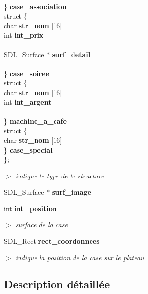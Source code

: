 \begin{CompactItemize}
\begin{tabbing}
\>\>\>\>\\\>\} {\bf case\_association}\\
\>struct \{\\
\>\>char {\bf str\_nom} [16]\\
\>\>int {\bf int\_prix}\\
\>\>\>\>\>\>\\\>\>SDL\_Surface $\ast$ {\bf surf\_detail}\\
\>\>\\\>\} {\bf case\_soiree}\\
\>struct \{\\
\>\>char {\bf str\_nom} [16]\\
\>\>int {\bf int\_argent}\\
\>\>\>\>\>\>\\\>\} {\bf machine\_a\_cafe}\\
\>struct \{\\
\>\>char {\bf str\_nom} [16]\\
\>\} {\bf case\_special}\\
\}; \\

\end{tabbing}\begin{CompactList}\small\item\em $>$ indique le type de la structure \item\end{CompactList}\item 
SDL\_\-Surface $\ast$ {\bf surf\_\-image}
\item 
int {\bf int\_\-position}
\begin{CompactList}\small\item\em $>$ surface de la case \item\end{CompactList}\item 
SDL\_\-Rect {\bf rect\_\-coordonnees}
\begin{CompactList}\small\item\em $>$ indique la position de la case sur le plateau \item\end{CompactList}\end{CompactItemize}


\subsection{Description d\'{e}taill\'{e}e}




